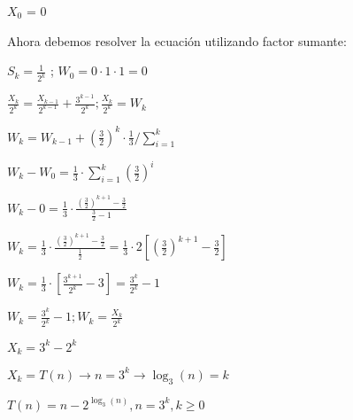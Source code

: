 \begin{solution}
\begin{center}
      $X_0$ = 0
  \end{center}
  
  Ahora debemos resolver la ecuación utilizando factor sumante:
  \begin{center}
    $S_k =  \frac{1}{2^k}$ ; $W_0 = 0 \cdot 1 \cdot 1 = 0$
    
    $\frac{X_k}{2^k} = \frac{X_{k-1}}{2^{k-1}} + \frac{3^{k-1}}{2^k} ; \frac{X_k}{2^k} = W_k$
    
    $W_k = W_{k-1} + (\frac{3}{2})^k \cdot \frac{1}{3}   /\displaystyle\sum_{i=1}^{k}$
    
    $W_k - W_0 = \frac{1}{3} \cdot \displaystyle\sum_{i=1}^{k} (\frac{3}{2})^i$
    
    $W_k - 0 = \frac{1}{3} \cdot \frac{(\frac{3}{2})^{k+1} - \frac{3}{2}}{\frac{3}{2}-1}$
    
    $W_k = \frac{1}{3} \cdot \frac{(\frac{3}{2})^{k+1}-\frac{3}{2}}{\frac{1}{2}} = \frac{1}{3} \cdot 2[(\frac{3}{2})^{k+1} - \frac{3}{2}]$
    
    $W_k = \frac{1}{3} \cdot [\frac{3^{k+1}}{2^k} - 3] = \frac{3^k}{2^k} - 1$
    
    $W_k = \frac{3^k}{2^k} - 1 ; W_k = \frac{X_k}{2^k}$
    
    $X_k = 3^k - 2^k$
    
    $X_k = T(n) \longrightarrow  n = 3^k \longrightarrow \log_{3}(n) = k$

    $T(n) = n - 2^{\log_{3}(n)}, n = 3^k, k \geq 0$
    
  \end{center}
  
\end{solution}
